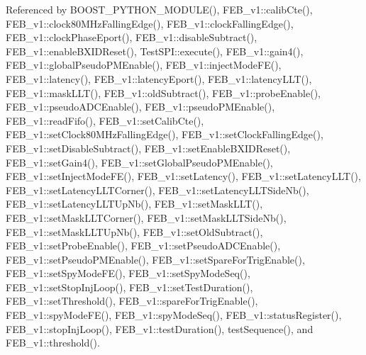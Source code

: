 Referenced by B\+O\+O\+S\+T\+\_\+\+P\+Y\+T\+H\+O\+N\+\_\+\+M\+O\+D\+U\+L\+E(), F\+E\+B\+\_\+v1\+::calib\+Cte(), F\+E\+B\+\_\+v1\+::clock80\+M\+Hz\+Falling\+Edge(), F\+E\+B\+\_\+v1\+::clock\+Falling\+Edge(), F\+E\+B\+\_\+v1\+::clock\+Phase\+Eport(), F\+E\+B\+\_\+v1\+::disable\+Subtract(), F\+E\+B\+\_\+v1\+::enable\+B\+X\+I\+D\+Reset(), Test\+S\+P\+I\+::execute(), F\+E\+B\+\_\+v1\+::gain4(), F\+E\+B\+\_\+v1\+::global\+Pseudo\+P\+M\+Enable(), F\+E\+B\+\_\+v1\+::inject\+Mode\+F\+E(), F\+E\+B\+\_\+v1\+::latency(), F\+E\+B\+\_\+v1\+::latency\+Eport(), F\+E\+B\+\_\+v1\+::latency\+L\+L\+T(), F\+E\+B\+\_\+v1\+::mask\+L\+L\+T(), F\+E\+B\+\_\+v1\+::old\+Subtract(), F\+E\+B\+\_\+v1\+::probe\+Enable(), F\+E\+B\+\_\+v1\+::pseudo\+A\+D\+C\+Enable(), F\+E\+B\+\_\+v1\+::pseudo\+P\+M\+Enable(), F\+E\+B\+\_\+v1\+::read\+Fifo(), F\+E\+B\+\_\+v1\+::set\+Calib\+Cte(), F\+E\+B\+\_\+v1\+::set\+Clock80\+M\+Hz\+Falling\+Edge(), F\+E\+B\+\_\+v1\+::set\+Clock\+Falling\+Edge(), F\+E\+B\+\_\+v1\+::set\+Disable\+Subtract(), F\+E\+B\+\_\+v1\+::set\+Enable\+B\+X\+I\+D\+Reset(), F\+E\+B\+\_\+v1\+::set\+Gain4(), F\+E\+B\+\_\+v1\+::set\+Global\+Pseudo\+P\+M\+Enable(), F\+E\+B\+\_\+v1\+::set\+Inject\+Mode\+F\+E(), F\+E\+B\+\_\+v1\+::set\+Latency(), F\+E\+B\+\_\+v1\+::set\+Latency\+L\+L\+T(), F\+E\+B\+\_\+v1\+::set\+Latency\+L\+L\+T\+Corner(), F\+E\+B\+\_\+v1\+::set\+Latency\+L\+L\+T\+Side\+Nb(), F\+E\+B\+\_\+v1\+::set\+Latency\+L\+L\+T\+Up\+Nb(), F\+E\+B\+\_\+v1\+::set\+Mask\+L\+L\+T(), F\+E\+B\+\_\+v1\+::set\+Mask\+L\+L\+T\+Corner(), F\+E\+B\+\_\+v1\+::set\+Mask\+L\+L\+T\+Side\+Nb(), F\+E\+B\+\_\+v1\+::set\+Mask\+L\+L\+T\+Up\+Nb(), F\+E\+B\+\_\+v1\+::set\+Old\+Subtract(), F\+E\+B\+\_\+v1\+::set\+Probe\+Enable(), F\+E\+B\+\_\+v1\+::set\+Pseudo\+A\+D\+C\+Enable(), F\+E\+B\+\_\+v1\+::set\+Pseudo\+P\+M\+Enable(), F\+E\+B\+\_\+v1\+::set\+Spare\+For\+Trig\+Enable(), F\+E\+B\+\_\+v1\+::set\+Spy\+Mode\+F\+E(), F\+E\+B\+\_\+v1\+::set\+Spy\+Mode\+Seq(), F\+E\+B\+\_\+v1\+::set\+Stop\+Inj\+Loop(), F\+E\+B\+\_\+v1\+::set\+Test\+Duration(), F\+E\+B\+\_\+v1\+::set\+Threshold(), F\+E\+B\+\_\+v1\+::spare\+For\+Trig\+Enable(), F\+E\+B\+\_\+v1\+::spy\+Mode\+F\+E(), F\+E\+B\+\_\+v1\+::spy\+Mode\+Seq(), F\+E\+B\+\_\+v1\+::status\+Register(), F\+E\+B\+\_\+v1\+::stop\+Inj\+Loop(), F\+E\+B\+\_\+v1\+::test\+Duration(), test\+Sequence(), and F\+E\+B\+\_\+v1\+::threshold().


